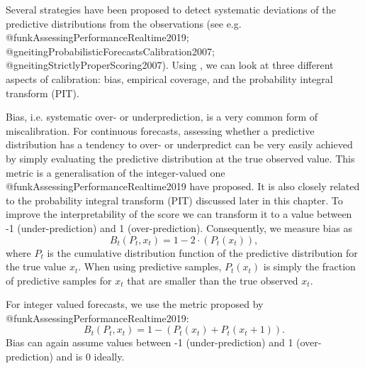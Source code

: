 \documentclass[article]{jss}
\begin{document}
Several strategies have been proposed to detect systematic deviations of the predictive distributions from the observations (see e.g. @funkAssessingPerformanceRealtime2019; @gneitingProbabilisticForecastsCalibration2007; @gneitingStrictlyProperScoring2007). Using , we can look at three different aspects of calibration: bias, empirical coverage, and the probability integral transform (PIT). 

Bias, i.e. systematic over- or underprediction, is a very common form of miscalibration. For continuous forecasts, assessing whether a predictive distribution has a tendency to over- or underpredict can be very easily achieved by simply evaluating the predictive distribution at the true observed value. This metric is a generalisation of the integer-valued one @funkAssessingPerformanceRealtime2019 have proposed. It is also closely related to the probability integral transform (PIT) discussed later in this chapter. To improve the interpretability of the score we can transform it to a value between -1 (under-prediction) and 1 (over-prediction). Consequently, we measure bias as
$$B_t (P_t, x_t) = 1 - 2 \cdot (P_t (x_t)),$$
where $P_t$ is the cumulative distribution function of the predictive distribution for the true value $x_t$. When using predictive samples, $P_t (x_t)$ is simply the fraction of predictive samples for $x_t$ that are smaller than the true observed $x_t$.

For integer valued forecasts, we use the metric proposed by @funkAssessingPerformanceRealtime2019: 
$$B_t (P_t, x_t) = 1 - (P_t (x_t) + P_t (x_t + 1)).$$
Bias can again assume values between -1 (under-prediction) and 1 (over-prediction) and is 0 ideally. 
\end{document}
